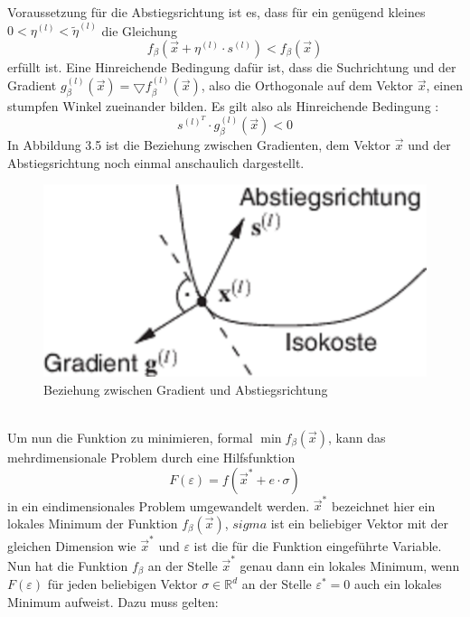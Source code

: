 Voraussetzung für die Abstiegsrichtung ist es, dass für ein genügend kleines $0 < \eta^{(l)} < \tilde{\eta}^{(l)}$ die Gleichung 
\begin{displaymath}
f_{\beta}(\vec x + \eta^{(l)} \cdot s^{(l)}) < f_{\beta}(\vec x)
\end{displaymath} erfüllt ist.
Eine Hinreichende Bedingung dafür ist, dass die Suchrichtung und der Gradient $g_\beta^{(l)}(\vec x) = \bigtriangledown f_\beta^{(l)}(\vec x)$, also die Orthogonale auf dem Vektor $\vec x$, einen stumpfen Winkel zueinander bilden. Es gilt also als Hinreichende Bedingung \cite{PAPA}:
\begin{displaymath}
s^{(l)^T} \cdot g_\beta^{(l)}(\vec x) < 0
\end{displaymath}
In Abbildung 3.5 ist die Beziehung zwischen Gradienten, dem Vektor $\vec x$ und der Abstiegsrichtung noch einmal anschaulich dargestellt.\\
\begin{figure}[ht]
\centering
\includegraphics[scale=1]{bilder/gradient}
\caption{Beziehung zwischen Gradient und Abstiegsrichtung}
\end{figure}\\
Um nun die Funktion zu minimieren, formal $\min f_\beta(\vec x)$, kann das mehrdimensionale Problem durch eine Hilfsfunktion 
\begin{displaymath}
F(\varepsilon) = f(\vec x^* +e \cdot \sigma)
\end{displaymath}
in ein eindimensionales Problem umgewandelt werden. $\vec x^*$ bezeichnet hier ein lokales Minimum der Funktion $f_\beta(\vec x)$, $sigma$ ist ein beliebiger Vektor mit der gleichen Dimension wie $\vec x^*$ und $\varepsilon$ ist die für die Funktion eingeführte Variable. Nun hat die Funktion $f_\beta$ an der Stelle $\vec x^*$ genau dann ein lokales Minimum, wenn $F(\varepsilon)$ für jeden beliebigen Vektor $\sigma \in \mathbb{R}^d$ an der Stelle $\varepsilon^*=0$ auch ein lokales Minimum aufweist. Dazu muss gelten:
